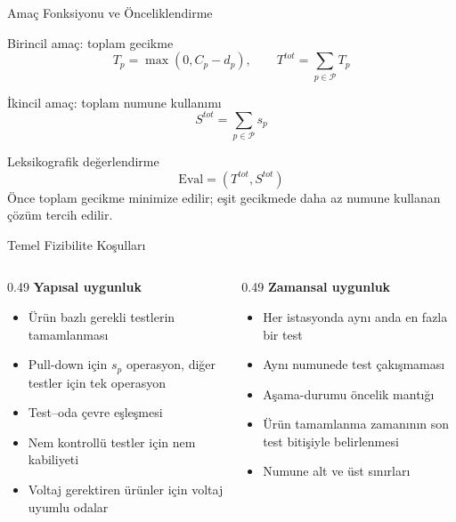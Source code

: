 \documentclass[aspectratio=169,11pt]{beamer}
\newcommand{\eval}{\mathrm{Eval}}
\begin{document}
\begin{frame}{Amaç Fonksiyonu ve Önceliklendirme}
  \begin{block}{Birincil amaç: toplam gecikme}
    \[
    T_p=\max(0,C_p-d_p), \qquad
    T^{tot}=\sum_{p\in\mathcal{P}}T_p
    \]
  \end{block}

  \begin{block}{İkincil amaç: toplam numune kullanımı}
    \[
    S^{tot}=\sum_{p\in\mathcal{P}}s_p
    \]
  \end{block}

  \begin{alertblock}{Leksikografik değerlendirme}
    \[
    \eval=(T^{tot},S^{tot})
    \]
    Önce toplam gecikme minimize edilir; eşit gecikmede daha az numune kullanan çözüm tercih edilir.
  \end{alertblock}
\end{frame}

\begin{frame}{Temel Fizibilite Koşulları}
  \begin{columns}[T,totalwidth=\textwidth]
    \begin{column}{0.49\textwidth}
      \textbf{Yapısal uygunluk}
      \begin{itemize}
        \item Ürün bazlı gerekli testlerin tamamlanması
        \item Pull-down için $s_p$ operasyon, diğer testler için tek operasyon
        \item Test--oda çevre eşleşmesi
        \item Nem kontrollü testler için nem kabiliyeti
        \item Voltaj gerektiren ürünler için voltaj uyumlu odalar
      \end{itemize}
    \end{column}
    \begin{column}{0.49\textwidth}
      \textbf{Zamansal uygunluk}
      \begin{itemize}
        \item Her istasyonda aynı anda en fazla bir test
        \item Aynı numunede test çakışmaması
        \item Aşama-durumu öncelik mantığı
        \item Ürün tamamlanma zamanının son test bitişiyle belirlenmesi
        \item Numune alt ve üst sınırları
      \end{itemize}
    \end{column}
  \end{columns}
\end{frame}
\end{document}
